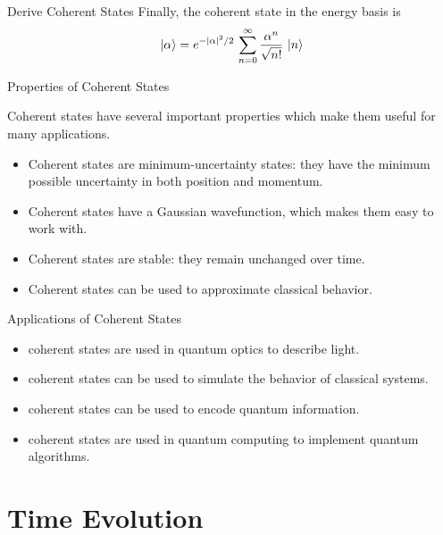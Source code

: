 \documentclass{loyola-beamer}
\begin{document}
\begin{frame}{Derive Coherent States}
    Finally, the coherent state in the energy basis is
    \begin{align*}
        \ket{\alpha} = e^{-|\alpha|^2/2}\,
        \sum_{n=0}^\infty \frac{\alpha^n}{\sqrt{n!}} \, \ket{n}
    \end{align*}

\end{frame}

\begin{frame}{Properties of Coherent States}

    Coherent states have several important properties which make them useful for many applications.

    \begin{itemize}
        \item Coherent states are minimum-uncertainty states: they have the minimum possible uncertainty in both position and momentum.
        \item Coherent states have a Gaussian wavefunction, which makes them easy to work with.
        \item Coherent states are stable: they remain unchanged over time.
        \item Coherent states can be used to approximate classical behavior.
    \end{itemize}

\end{frame}

\begin{frame}{Applications of Coherent States}

    \begin{itemize}
        \item coherent states are used in quantum optics to describe light.
        \item coherent states can be used to simulate the behavior of classical systems.
        \item coherent states can be used to encode quantum information.
        \item coherent states are used in quantum computing to implement quantum algorithms.
    \end{itemize}

\end{frame}

\section{Time Evolution}
\end{document}
